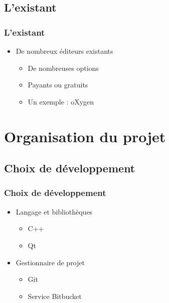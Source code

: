 \documentclass{beamer}
\begin{document}
	\subsection{L'existant}

	\begin{frame}
		\frametitle{L'existant}


    \begin{itemize}
    \item De nombreux éditeurs existants
    \pause
       \begin{itemize}
        \item De nombreuses options
        \pause
        \item Payants ou gratuits
        \pause
        \item Un exemple : oXygen
        \end{itemize}
    \end{itemize}


	\end{frame}




	\section{Organisation du projet}

	\subsection{Choix de développement}

	\begin{frame}
		\frametitle{Choix de développement}

     \begin{itemize}
      \item Langage et bibliothèques
       \begin{itemize}
        \item C++
        \item Qt
        \end{itemize}
       \pause
      \item Gestionnaire de projet
       \begin{itemize}
        \item Git
         \pause
        \item Service Bitbucket
        \end{itemize}
    \end{itemize}

	\end{frame}
\end{document}
